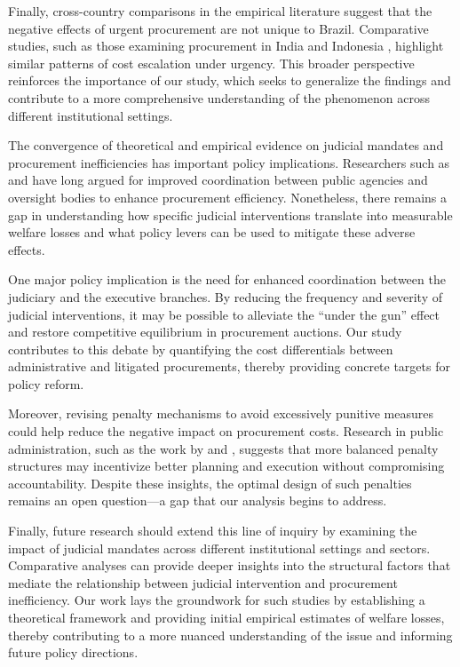 Finally, cross-country comparisons in the empirical literature suggest that the negative effects of urgent procurement are not unique to Brazil. Comparative studies, such as those examining procurement in India and Indonesia \citep{lewisfaupel2016can}, highlight similar patterns of cost escalation under urgency. This broader perspective reinforces the importance of our study, which seeks to generalize the findings and contribute to a more comprehensive understanding of the phenomenon across different institutional settings.

The convergence of theoretical and empirical evidence on judicial mandates and procurement inefficiencies has important policy implications. Researchers such as \citet{perry1988public} and \citet{otoolle2003bureaucracy} have long argued for improved coordination between public agencies and oversight bodies to enhance procurement efficiency. Nonetheless, there remains a gap in understanding how specific judicial interventions translate into measurable welfare losses and what policy levers can be used to mitigate these adverse effects.

One major policy implication is the need for enhanced coordination between the judiciary and the executive branches. By reducing the frequency and severity of judicial interventions, it may be possible to alleviate the “under the gun” effect and restore competitive equilibrium in procurement auctions. Our study contributes to this debate by quantifying the cost differentials between administrative and litigated procurements, thereby providing concrete targets for policy reform.

Moreover, revising penalty mechanisms to avoid excessively punitive measures could help reduce the negative impact on procurement costs. Research in public administration, such as the work by \citet{williams2018management} and \citet{rasul2018management}, suggests that more balanced penalty structures may incentivize better planning and execution without compromising accountability. Despite these insights, the optimal design of such penalties remains an open question—a gap that our analysis begins to address.

Finally, future research should extend this line of inquiry by examining the impact of judicial mandates across different institutional settings and sectors. Comparative analyses can provide deeper insights into the structural factors that mediate the relationship between judicial intervention and procurement inefficiency. Our work lays the groundwork for such studies by establishing a theoretical framework and providing initial empirical estimates of welfare losses, thereby contributing to a more nuanced understanding of the issue and informing future policy directions.
